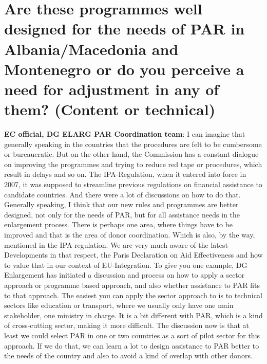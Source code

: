 \section{Are these programmes well designed for the needs of PAR in Albania/Macedonia and Montenegro or do you perceive a need for adjustment in any of them? (Content or technical) }
\label{sec:technical}
\textbf{EC official, DG ELARG PAR Coordination team}: I can imagine that generally speaking in the countries that the procedures are felt to be cumbersome or bureaucratic. But on the other hand, the Commission has a constant dialogue on improving the programmes and trying to reduce red tape or procedures, which result in delays and so on. The IPA-Regulation, when it entered into force in 2007, it was supposed to streamline previous regulations on financial assistance to candidate countries. And there were a lot of discussions on how to do that. Generally speaking, I think that our new rules and programmes are better designed, not only for the needs of PAR, but for all assistance needs in the enlargement process. There is perhaps one area, where things have to be improved and that is the area of donor coordination. Which is also, by the way, mentioned in the IPA regulation. We are very much aware of the latest Developments in that respect, the Paris Declaration on Aid Effectiveness and how to value that in our context of EU-Integration. To give you one example, DG Enlargement has initiated a discussion and process on how to apply a sector approach or programme based approach, and also whether assistance to PAR fits to that approach. The easiest you can apply the sector approach to is to technical sectors like education or transport, where we usually only have one main stakeholder, one ministry in charge. It is a bit different with PAR, which is a kind of cross-cutting sector, making it more difficult. The discussion now is that at least we could select PAR in one or two countries as a sort of pilot sector for this approach. If we do that, we can learn a lot to design assistance to PAR better to the needs of the country and also to avoid a kind of overlap with other donors. \\
